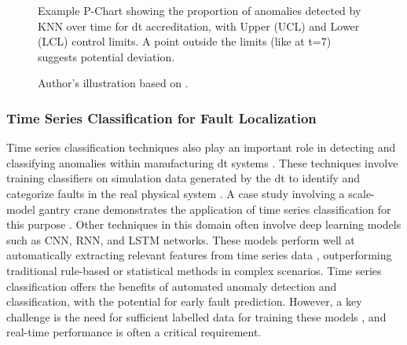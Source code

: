 \begin{figure}[htbp]
    \caption[Proportion chart for VVUQ]{Example P-Chart showing the proportion of anomalies detected by KNN over time for \gls{dt} accreditation, with Upper (UCL) and Lower (LCL) control limits. A point outside the limits (like at t=7) suggests potential deviation.}
    \label{fig:pchart_knn_dt}
    \caption*{Author's illustration based on \textcite{dos2024simulation}. }
\end{figure}

\subsubsection*{Time Series Classification for Fault Localization}
Time series classification techniques also play an important role in detecting and classifying anomalies within manufacturing \gls{dt} systems \autocite{Lugaresi2023compind}. These techniques involve training classifiers on simulation data generated by the \gls{dt} to identify and categorize faults in the real physical system \autocite{dihan2024digital}. A case study involving a scale-model gantry crane demonstrates the application of time series classification for this purpose \autocite{mertens2024localizing}.
Other techniques in this domain often involve deep learning models such as CNN, RNN, and LSTM networks. These models perform well at automatically extracting relevant features from time series data \autocite{cao2023real}, outperforming traditional rule-based or statistical methods in complex scenarios. Time series classification offers the benefits of automated anomaly detection and classification, with the potential for early fault prediction. However, a key challenge is the need for sufficient labelled data for training these models \autocite{zemskov2024security}, and real-time performance is often a critical requirement.

